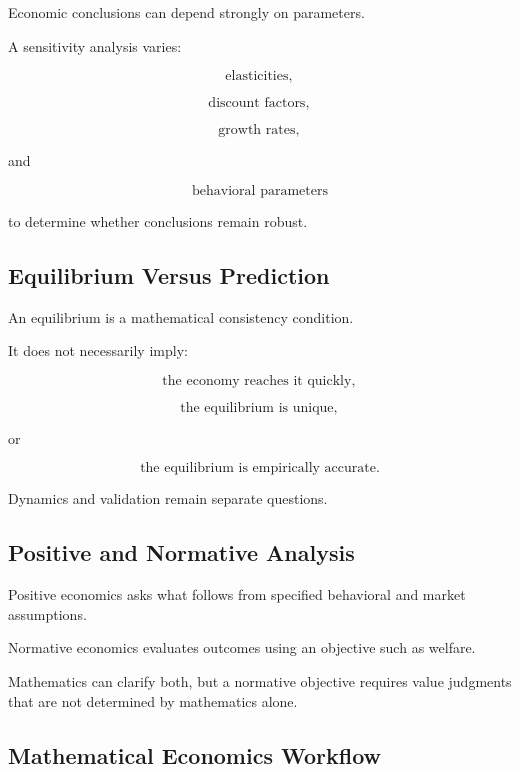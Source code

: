 Economic conclusions can depend strongly on parameters.

A sensitivity analysis varies:

\[
\boxed{
\text{elasticities},
}
\]

\[
\boxed{
\text{discount factors},
}
\]

\[
\boxed{
\text{growth rates},
}
\]

and

\[
\boxed{
\text{behavioral parameters}
}
\]

to determine whether conclusions remain robust.

\subsection{Equilibrium Versus Prediction}
\label{subsec:equilibrium-versus-prediction}

An equilibrium is a mathematical consistency condition.

It does not necessarily imply:

\[
\boxed{
\text{the economy reaches it quickly},
}
\]

\[
\boxed{
\text{the equilibrium is unique},
}
\]

or

\[
\boxed{
\text{the equilibrium is empirically accurate}.
}
\]

Dynamics and validation remain separate questions.

\subsection{Positive and Normative Analysis}
\label{subsec:positive-normative}

Positive economics asks what follows from specified behavioral and market
assumptions.

Normative economics evaluates outcomes using an objective such as welfare.

Mathematics can clarify both, but a normative objective requires value
judgments that are not determined by mathematics alone.

\subsection{Mathematical Economics Workflow}
\label{subsec:mathematical-economics-workflow}

